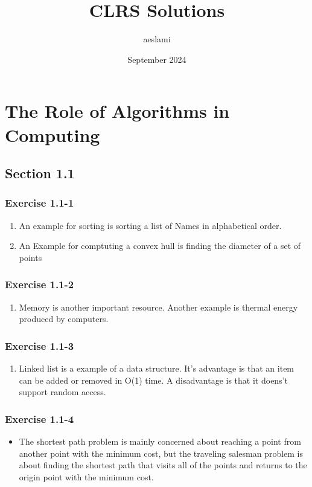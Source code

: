 \documentclass{book}
\title{CLRS Solutions}
\author{aeslami }
\date{September 2024}
\begin{document}
\maketitle

\chapter{The Role of Algorithms in Computing}

\section{Section 1.1}

\subsection{Exercise 1.1-1}
\begin{enumerate}
    \item An example for sorting is sorting a list of Names in alphabetical order.
    \item An Example for comptuting a convex hull is finding the diameter of a set of points

\end{enumerate}

\subsection{Exercise 1.1-2}
\begin{enumerate}
    \item Memory is another important resource. Another example is thermal energy 
    produced by computers.
\end{enumerate}

\subsection{Exercise 1.1-3}
\begin{enumerate}
    \item Linked list is a example of a data structure. It's advantage is that an 
    item can be added or removed in O(1) time. A disadvantage is that it 
    doens't support random access.

\end{enumerate}
\subsection{Exercise 1.1-4}
\begin{itemize}
    \item The shortest path problem is mainly concerned about reaching a point 
    from another point with the minimum cost, but the traveling salesman problem 
    is about finding the shortest path that visits all of the points and returns 
    to the origin point with the minimum cost.
\end{itemize}
\end{document}
